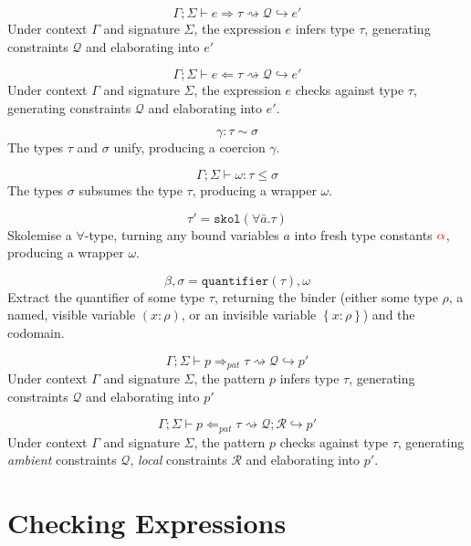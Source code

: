 \documentclass[11pt]{article}
\newcommand{\checks}{\Leftarrow}
\newcommand{\infers}{\Rightarrow}
\newcommand{\cons}{\rightsquigarrow}
\newcommand{\reduces}{\hookrightarrow}
\newcommand{\skol}[1]{\mathtt{skol}(#1)}
\newcommand{\quant}[1]{\mathtt{quantifier}\left(#1\right)}
\newcommand{\skv}[1]{{\color{red} \mathbf{#1}}}
\newcommand{\Ambient}{\Gamma; \Sigma \vdash}
\begin{document}
$$\Ambient e \infers \tau \cons \mathscr{Q} \reduces e'$$
Under context $\Gamma$ and signature $\Sigma$, the expression $e$ infers type
$\tau$, generating constraints $\mathscr{Q}$ and elaborating into $e'$

$$\Ambient e \checks \tau \cons \mathscr{Q} \reduces e'$$
Under context $\Gamma$ and signature $\Sigma$, the expression $e$ checks
against type $\tau$, generating constraints $\mathscr{Q}$ and elaborating into
  $e'$.

$$\gamma: \tau \sim \sigma$$
The types $\tau$ and $\sigma$ unify, producing a coercion $\gamma$.

$$\Ambient \omega: \tau \le \sigma$$
The types $\sigma$ subsumes the type $\tau$, producing a wrapper $\omega$.

$$\tau' = \skol{\forall{\bar{a}}. \tau}$$
Skolemise a $\forall$-type, turning any bound variables $a$ into fresh
type constants $\skv{\alpha}$, producing a wrapper $\omega$.

$$\beta, \sigma = \quant{\tau}, \omega$$
Extract the quantifier of some type $\tau$, returning the binder (either some
type $\rho$, a named, visible variable $\left(x:\rho\right)$, or an invisible
variable $\left\{x:\rho\right\}$) and the codomain.

$$\Ambient p \infers_{pat} \tau \cons \mathscr{Q} \reduces p'$$
Under context $\Gamma$ and signature $\Sigma$, the pattern $p$ infers type
$\tau$, generating constraints $\mathscr{Q}$ and elaborating into $p'$

$$\Ambient p \checks_{pat} \tau \cons \mathscr{Q}; \mathscr{R} \reduces p'$$
Under context $\Gamma$ and signature $\Sigma$, the pattern $p$ checks against
type $\tau$, generating \textit{ambient} constraints $\mathscr{Q}$,
\textit{local} constraints $\mathscr{R}$ and elaborating into $p'$.

\section{Checking Expressions}
\end{document}

